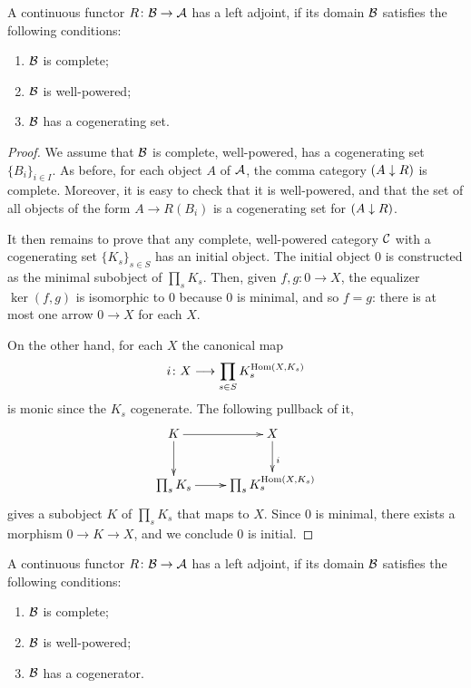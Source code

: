   \begin{thm}
    A continuous functor $R\colon{\cal B}\to{\cal A}$ has a left adjoint, if its domain ${\cal B}$ satisfies the following conditions:
    \begin{enumerate}
      \item ${\cal B}$ is complete;
      \item ${\cal B}$ is well-powered;
      \item ${\cal B}$ has a cogenerating set.
    \end{enumerate}
  \end{thm}
  \begin{proof}
    We assume that ${\cal B}$ is complete, well-powered, has a cogenerating set $\{B_i\}_{i\in I}$.
    As before, for each object $A$ of ${\cal A}$, the comma category $(A\downarrow R)$ is complete. Moreover, it is easy to check that it is well-powered, and that the set of all objects of the form $A\to R(B_i)$ is a cogenerating set for $(A\downarrow R)$.

    It then remains to prove that any complete, well-powered category ${\cal C}$ with a cogenerating set $\{K_s\}_{s\in S}$ has an initial object. The initial object $0$ is constructed as the minimal subobject of $\prod_sK_s$. Then, given $f,g\colon0\to X$, the equalizer $\ker(f,g)$ is isomorphic to $0$ because $0$ is minimal, and so $f=g$: there is at most one arrow $0\to X$ for each $X$.

    On the other hand, for each $X$ the canonical map
    \begin{equation*}
      i\colon X\longrightarrow\prod_{s\in S}K_s^{\operatorname{Hom}(X,K_s)}
    \end{equation*}
    is monic since the $K_s$ cogenerate.
    The following pullback of it,
      \begin{displaymath}
        \xymatrix{
          K\ar[r]\ar[d]&X\ar[d]^{i}\\
          \prod_sK_s\ar[r]&\prod_{s}K_s^{\Hom(X,K_s)}
         }
      \end{displaymath}
      gives a subobject $K$ of $\prod_sK_s$ that maps to $X$. Since $0$ is minimal, there exists a morphism $0\to K\to X$, and we conclude $0$ is initial.
  \end{proof}
  \begin{cor}
    A continuous functor $R\colon{\cal B}\to{\cal A}$ has a left adjoint, if its domain ${\cal B}$ satisfies the following conditions:
    \begin{enumerate}
      \item ${\cal B}$ is complete;
      \item ${\cal B}$ is well-powered;
      \item ${\cal B}$ has a cogenerator.
    \end{enumerate}
  \end{cor}
